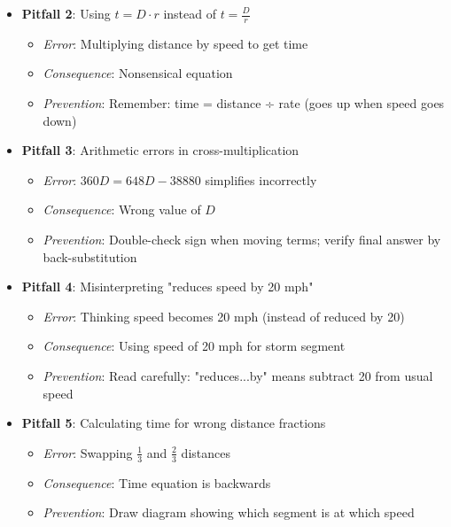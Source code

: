 \documentclass[11pt]{article}
\begin{document}
\begin{roadmapbox}
\begin{itemize}[leftmargin=*]
    \item \textbf{Pitfall 2}: Using $t = D \cdot r$ instead of $t = \frac{D}{r}$
    \begin{itemize}[leftmargin=*]
        \item \textit{Error}: Multiplying distance by speed to get time
        \item \textit{Consequence}: Nonsensical equation
        \item \textit{Prevention}: Remember: time = distance ÷ rate (goes up when speed goes down)
    \end{itemize}
    
    \item \textbf{Pitfall 3}: Arithmetic errors in cross-multiplication
    \begin{itemize}[leftmargin=*]
        \item \textit{Error}: $360D = 648D - 38880$ simplifies incorrectly
        \item \textit{Consequence}: Wrong value of $D$
        \item \textit{Prevention}: Double-check sign when moving terms; verify final answer by back-substitution
    \end{itemize}
    
    \item \textbf{Pitfall 4}: Misinterpreting "reduces speed by 20 mph"
    \begin{itemize}[leftmargin=*]
        \item \textit{Error}: Thinking speed becomes 20 mph (instead of reduced by 20)
        \item \textit{Consequence}: Using speed of 20 mph for storm segment
        \item \textit{Prevention}: Read carefully: "reduces...by" means subtract 20 from usual speed
    \end{itemize}
    
    \item \textbf{Pitfall 5}: Calculating time for wrong distance fractions
    \begin{itemize}[leftmargin=*]
        \item \textit{Error}: Swapping $\frac{1}{3}$ and $\frac{2}{3}$ distances
        \item \textit{Consequence}: Time equation is backwards
        \item \textit{Prevention}: Draw diagram showing which segment is at which speed
    \end{itemize}
\end{itemize}


\end{roadmapbox}
\end{document}
